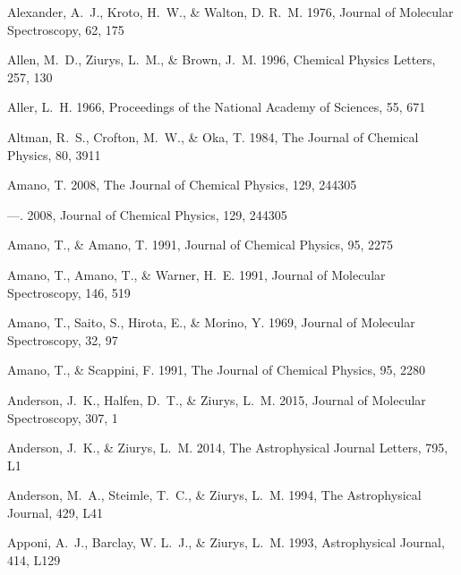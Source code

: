 \documentclass[twocolumn]{aastex631}
\begin{document}
\begin{thebibliography}{}
Alexander, A.~J., Kroto, H.~W., \& Walton, D. R.~M. 1976, Journal of Molecular
  Spectroscopy, 62, 175

Allen, M.~D., Ziurys, L.~M., \& Brown, J.~M. 1996, Chemical Physics Letters,
  257, 130

Aller, L.~H. 1966, Proceedings of the National Academy of Sciences, 55, 671

Altman, R.~S., Crofton, M.~W., \& Oka, T. 1984, The Journal of Chemical
  Physics, 80, 3911

Amano, T. 2008{}, The Journal of Chemical Physics, 129, 244305

---. 2008{}, Journal of Chemical Physics, 129, 244305

Amano, T., \& Amano, T. 1991, Journal of Chemical Physics, 95, 2275

Amano, T., Amano, T., \& Warner, H.~E. 1991, Journal of Molecular Spectroscopy,
  146, 519

Amano, T., Saito, S., Hirota, E., \& Morino, Y. 1969, Journal of Molecular
  Spectroscopy, 32, 97

Amano, T., \& Scappini, F. 1991, The Journal of Chemical Physics, 95, 2280

Anderson, J.~K., Halfen, D.~T., \& Ziurys, L.~M. 2015, Journal of Molecular
  Spectroscopy, 307, 1

Anderson, J.~K., \& Ziurys, L.~M. 2014, The Astrophysical Journal Letters, 795,
  L1

Anderson, M.~A., Steimle, T.~C., \& Ziurys, L.~M. 1994, The Astrophysical
  Journal, 429, L41

Apponi, A.~J., Barclay, W. L.~J., \& Ziurys, L.~M. 1993, Astrophysical Journal,
  414, L129


\end{thebibliography}
\end{document}
